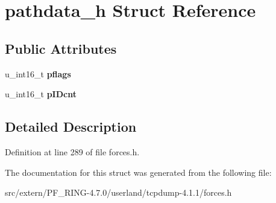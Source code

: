 \hypertarget{structpathdata__h}{
\section{pathdata\_\-h Struct Reference}
\label{structpathdata__h}
}
\subsection*{Public Attributes}
\begin{DoxyCompactItemize}
\item 
\hypertarget{structpathdata__h_a3cfa54a2399e45a01fc0e3e96a491f27}{
u\_\-int16\_\-t {\bfseries pflags}}
\label{structpathdata__h_a3cfa54a2399e45a01fc0e3e96a491f27}

\item 
\hypertarget{structpathdata__h_a2b4eef0c53ec44481771733ece923ded}{
u\_\-int16\_\-t {\bfseries pIDcnt}}
\label{structpathdata__h_a2b4eef0c53ec44481771733ece923ded}

\end{DoxyCompactItemize}


\subsection{Detailed Description}


Definition at line 289 of file forces.h.



The documentation for this struct was generated from the following file:\begin{DoxyCompactItemize}
\item 
src/extern/PF\_\-RING-\/4.7.0/userland/tcpdump-\/4.1.1/forces.h\end{DoxyCompactItemize}
